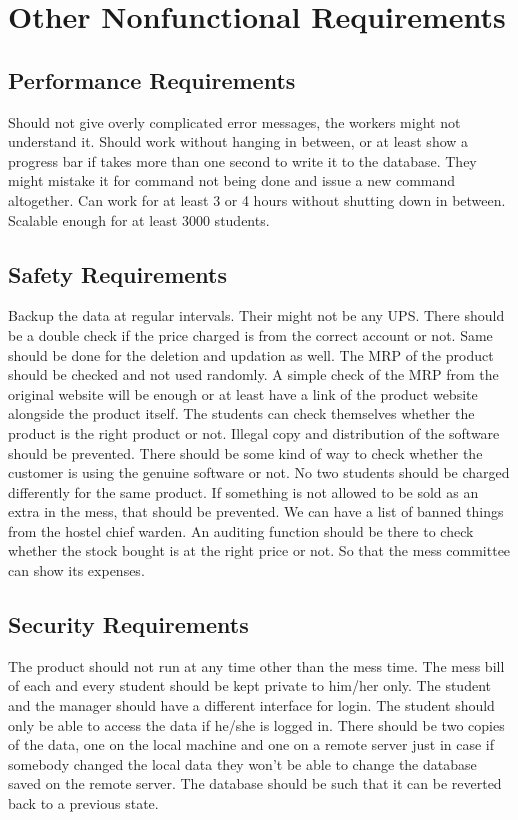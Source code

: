 \documentclass{scrreprt}
\begin{document}
\chapter{Other Nonfunctional Requirements}

\section{Performance Requirements}
Should not give overly complicated error messages, the workers might not understand it.
Should work without hanging in between, or at least show a progress bar if takes more than one second to write it to the database.
They might mistake it for command not being done and issue a new command altogether.
Can work for at least 3 or 4 hours without shutting down in between.
Scalable enough for at least 3000 students.

\section{Safety Requirements}
Backup the data at regular intervals. Their might not be any UPS.
There should be a double check if the price charged is from the correct account or not. Same should be done for the deletion and updation as well. The MRP of the product should be checked and not used randomly. A simple check of the MRP from the original website will be enough or at least have a link of the product website alongside the product itself. The students can check themselves whether the product is the right product or not.
Illegal copy and distribution of the software should be prevented.
There should be some kind of way to check whether the customer is using the genuine software or not.
No two students should be charged differently for the same product.
If something is not allowed to be sold as an extra in the mess, that should be prevented. We can have a list of banned things from the hostel chief warden.
An auditing function should be there to check whether the stock bought is at the right price or not. So that the mess committee can show its expenses.

\section{Security Requirements}
The product should not run at any time other than the mess time.
The mess bill of each and every student should be kept private to him/her only. The student and the manager should have a different interface for login. The student should only be able to access the data if he/she is logged in.
There should be two copies of the data, one on the local machine and one on a remote server just in case if somebody changed the local data they won't be able to change the database saved on the remote server.
The database should be such that it can be reverted back to a previous state.
\end{document}
